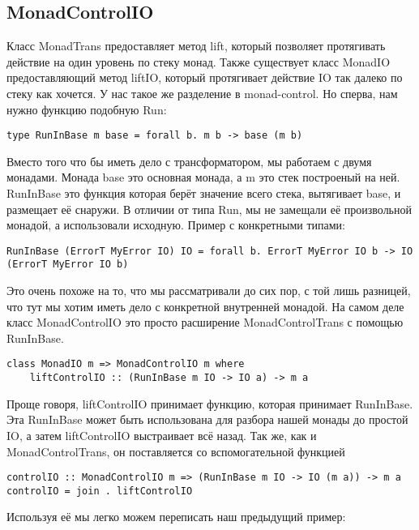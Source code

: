\subsection{MonadControlIO}

Класс MonadTrans предоставляет метод lift, который позволяет протягивать действие на один уровень по стеку монад. Также существует класс MonadIO предоставляющий метод liftIO, который протягивает действие IO так далеко по стеку как хочется. У нас такое же разделение в monad-control. Но сперва, нам нужно функцию подобную Run:

\begin{lstlisting}
type RunInBase m base = forall b. m b -> base (m b)
\end{lstlisting}

Вместо того что бы иметь дело с трансформатором, мы работаем с двумя монадами. Монада base это основная монада, а m это стек построеный на ней. RunInBase это функция которая берёт значение всего стека, вытягивает base, и размещает её снаружи. В отличии от типа Run, мы не замещали её произвольной монадой, а использовали исходную. Пример с конкретными типами:

\begin{lstlisting}
RunInBase (ErrorT MyError IO) IO = forall b. ErrorT MyError IO b -> IO (ErrorT MyError IO b)
\end{lstlisting}

Это очень похоже на то, что мы рассматривали до сих пор, с той лишь разницей, что тут мы хотим иметь дело с конкретной внутренней монадой. На самом деле класс MonadControlIO это просто расширение MonadControlTrans с помощью RunInBase.

\begin{lstlisting}
class MonadIO m => MonadControlIO m where
    liftControlIO :: (RunInBase m IO -> IO a) -> m a
\end{lstlisting}

Проще говоря, liftControlIO принимает функцию, которая принимает RunInBase. Эта RunInBase может быть использована для разбора нашей монады до простой IO, а затем liftControlIO выстраивает всё назад. Так же, как и MonadControlTrans, он поставляется со вспомогательной функцией

\begin{lstlisting}
controlIO :: MonadControlIO m => (RunInBase m IO -> IO (m a)) -> m a
controlIO = join . liftControlIO
\end{lstlisting}

Используя её мы легко можем переписать наш предыдущий пример:

